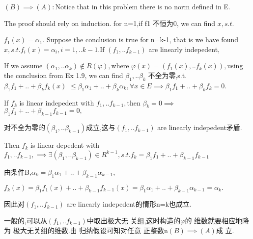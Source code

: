 \documentclass{article}
\begin{document}
$\left( B\right) \implies \left( A\right) :$Notice that in this problem
there is no norm defined in E.

The proof should rely on induction. for n=1,if f1 不恒为0,
we can find $x,s.t.$

$f_{1}\left( x\right) =\alpha _{1}.$ Suppose the conclusion is true for
n=k-1, that is we have found $x,s.t.f_{i}\left( x\right) =\alpha
_{i},i=1,..k-1.$If $\left( f_{1},..f_{k-1}\right) $ are linearly indepedent$,
$

If we assume $\left( \alpha _{1},..\alpha _{k}\right) \notin R\left( \varphi
\right) ,$where $\varphi \left( x\right) =\left( f_{1}\left( x\right)
,..f_{k}\left( x\right) \right) ,$using the conclusion from Ex 1.9, we can
find $\beta _{1},..\beta _{k}$ 不全为零,s.t. $\beta
_{1}f_{1}+..+\beta _{k}f_{k}\left( x\right) $ $\leq \beta _{1}\alpha
_{1}+..+\beta _{k}\alpha _{k},\forall x\in E\implies \beta
_{1}f_{1}+..+\beta _{k}f_{k}=0.$

\bigskip If $f_{k}$ is linear indepedent with $f_{1},..f_{k-1},$then $\beta
_{k}=0\implies $ $\beta _{1}f_{1}+..+\beta _{k-1}f_{k-1}=0,$

对不全为零的$\left( \beta _{1},..\beta
_{k-1}\right) $成立,这与$\left(
f_{1},..f_{k-1}\right) $ are linearly indepedent矛盾.

Then $f_{k}$ is linear depedent with $f_{1},..f_{k-1},\implies \exists
\left( \beta _{1},..\beta _{k-1}\right) \in R^{k-1},s.t.f_{k}=\beta
_{1}f_{1}+..+\beta _{k-1}f_{k-1}$

由条件B,$\alpha _{k}=\beta _{1}\alpha _{1}+..+\beta
_{k-1}\alpha _{k-1},$

$f_{k}\left( x\right) =\beta _{1}f_{1}\left( x\right) +..+\beta
_{k-1}f_{k-1}\left( x\right) =\beta _{1}\alpha _{1}+..+\beta _{k-1}\alpha
_{k-1}=\alpha _{k}.$

因此对$\left( f_{1},..f_{k-1}\right) $ are linearly
indepedent的情形n=k也成立.

一般的,可以从$\left(
f_{1},..f_{k-1}\right) $中取出极大无%
关组,这时构造的$\varphi $的%
维数就要相应地降为%
极大无关组的维数.由%
归纳假设可知对任意%
正整数n$\left( B\right) \implies \left( A\right) $成%
立.
\end{document}
